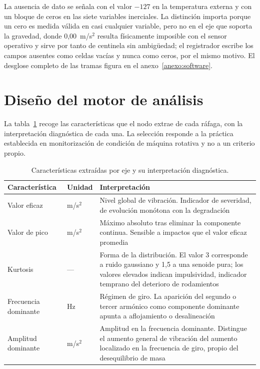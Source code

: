 La ausencia de dato se señala con el valor $-127$ en la temperatura externa y con un bloque de
ceros en las siete variables inerciales. La distinción importa porque un cero es medida válida en
casi cualquier variable, pero no en el eje que soporta la gravedad, donde \mbox{0,00 m/s$^2$}
resulta físicamente imposible con el sensor operativo y sirve por tanto de centinela sin
ambigüedad; el registrador escribe los campos ausentes como celdas vacías y nunca como ceros, por
el mismo motivo. El desglose completo de las tramas figura en el anexo~\ref{anexo:software}.

\section{Diseño del motor de análisis}

La tabla~\ref{table:caracteristicas} recoge las características que el nodo extrae de cada
ráfaga, con la interpretación diagnóstica de cada una. La selección responde a la práctica
establecida en monitorización de condición de máquina rotativa y no a un criterio propio.

\begin{table}[ht!]
\caption{Características extraídas por eje y su interpretación diagnóstica.}
\label{table:caracteristicas}
\centering
\begin{tabular}{|p{2.3cm}|p{1.7cm}|p{8.4cm}|}
\hline
\textbf{Característica} & \textbf{Unidad} & \textbf{Interpretación} \\
\hline
Valor eficaz & m/s$^2$ & Nivel global de vibración. Indicador de severidad, de evolución
monótona con la degradación \\
\hline
Valor de pico & m/s$^2$ & Máximo absoluto tras eliminar la componente continua. Sensible a
impactos que el valor eficaz promedia \\
\hline
Kurtosis & --- & Forma de la distribución. El valor 3 corresponde a ruido gaussiano y 1,5 a
una senoide pura; los valores elevados indican impulsividad, indicador temprano del
deterioro de rodamientos \\
\hline
Frecuencia dominante & Hz & Régimen de giro. La aparición del segundo o tercer armónico como
componente dominante apunta a aflojamiento o desalineación \\
\hline
Amplitud dominante & m/s$^2$ & Amplitud en la frecuencia dominante. Distingue el aumento
general de vibración del aumento localizado en la frecuencia de giro, propio del
desequilibrio de masa \\
\hline
\end{tabular}
\end{table}

